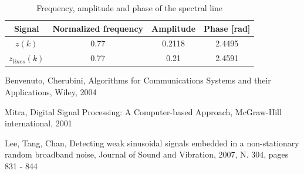 \documentclass[10pt]{article}
\numberwithin{equation}{section}
\begin{document}
\begin{table}[h!]
  \centering
  \begin{tabular}{c|c|c|c}
    Signal & Normalized frequency & Amplitude & Phase [rad] \\ \hline
    $z(k)  $    & 0.77           & 0.2118    & 2.4495      \\
    $z_{lines}(k)$ & 0.77           & 0.21      & 2.4591    \\
  \end{tabular}
  \caption{Frequency, amplitude and phase of the spectral line}
  \label{table:ampphase}
\end{table}




\begin{thebibliography}{10}

Benvenuto, Cherubini, Algorithms for Communications Systems and their Applications, Wiley, 2004

Mitra, Digital Signal Processing: A Computer-based Approach, McGraw-Hill international, 2001

Lee, Tang, Chan, Detecting weak sinusoidal signals embedded in a non-stationary random broadband noise, Journal of Sound and Vibration, 2007, N. 304, pages 831 - 844

\end{thebibliography}
\end{document}
